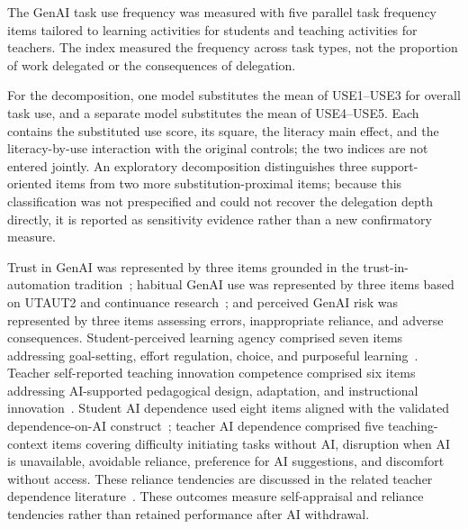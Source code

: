 \documentclass[sustainability,article,accept,moreauthors]{Definitions/mdpi}
\begin{document}
The GenAI task use frequency was measured with five parallel task frequency items tailored to learning activities for students and teaching activities for teachers. The index measured the frequency across task types, not the proportion of work delegated or the consequences of delegation.

For the decomposition, one model substitutes the mean of USE1--USE3 for overall task use, and a separate model substitutes the mean of USE4--USE5. Each contains the substituted use score, its square, the literacy main effect, and the literacy-by-use interaction with the original controls; the two indices are not entered jointly. An exploratory decomposition distinguishes three support-oriented items from two more substitution-proximal items; because this classification was not prespecified and could not recover the delegation depth directly, it is reported as sensitivity evidence rather than a new confirmatory measure.

Trust in GenAI was represented by three items grounded in the trust-in-automation tradition~\cite{lee2004,hoff2015}; habitual GenAI use was represented by three items based on UTAUT2 and continuance research~\cite{venkatesh2012,limayem2007}; and perceived GenAI risk was represented by three items assessing errors, inappropriate reliance, and adverse consequences.
Student-perceived learning agency comprised seven items addressing goal-setting, effort regulation, choice, and purposeful learning~\cite{bandura2001,xia2026}. Teacher self-reported teaching innovation competence comprised six items addressing AI-supported pedagogical design, adaptation, and instructional innovation~\cite{mishra2023,zhaiTeacher2025}. Student AI dependence used eight items aligned with the validated dependence-on-AI construct~\cite{morales2024}; teacher AI dependence comprised five teaching-context items covering difficulty initiating tasks without AI, disruption when AI is unavailable, avoidable reliance, preference for AI suggestions, and discomfort without access. These reliance tendencies are discussed in the related teacher dependence literature~\cite{du2026}. These outcomes measure self-appraisal and reliance tendencies rather than retained performance after AI withdrawal.
\end{document}
